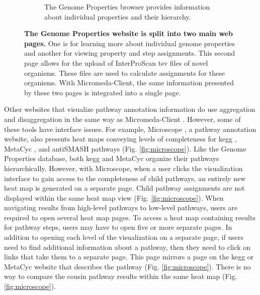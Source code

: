 \begin{figure}[!ht]
\begin{subfigure}[b]{0.46\textwidth}
         \caption{The Genome Properties browser provides information about 
individual properties and their hierarchy.}
         \label{fig:property-browser}
     \end{subfigure}
     \caption[The Genome Properties website is split into two main web 
pages.]{\textbf{The Genome Properties website is split into two main web pages.} 
One is for learning more about individual genome properties and another for 
viewing property and step assignments. This second page allows for the upload of 
InterProScan \gls{tsv} files of novel organisms. These files are used to 
calculate assignments for these organisms. With Micromeda-Client, the same 
information presented by these two pages is integrated into a single page.}
     \label{fig:genome-properties-interface}
\end{figure}

Other websites that visualize pathway annotation information do use aggregation 
and disaggregation in the same way as Micromeda-Client 
\cite{vallenet2016microscope,darzi2019functree2}. However, some of these tools 
have interface issues. For example, Microscope \cite{vallenet2016microscope}, a 
pathway annotation website, also presents heat maps conveying levels of 
completeness for \gls{kegg} \cite{kanehisa2000kegg}, MetaCyc 
\cite{karp2002metacyc}, and antiSMASH \cite{blin2019antismash} pathways (Fig. 
\ref{fig:microscope}). Like the Genome Properties database, both \gls{kegg} and 
MetaCyc organize their pathways hierarchically. However, with Microscope, when a 
user clicks the visualization interface to gain access to the completeness of 
child pathways, an entirely new heat map is generated on a separate page. Child 
pathway assignments are not displayed within the same heat map view (Fig. 
\ref{fig:microscope}). When navigating results from high-level pathways to 
low-level pathways, users are required to open several heat map pages. To access 
a heat map containing results for pathway steps, users may have to open five or 
more separate pages. In addition to opening each level of the visualization on a 
separate page, if users need to find additional information about a pathway, 
then they need to click on links that take them to a separate page. This page 
mirrors a page on the \gls{kegg} or MetaCyc website that describes the pathway 
(Fig. \ref{fig:microscope}). There is no way to compare the cousin pathway 
results within the same heat map (Fig. \ref{fig:microscope}).

